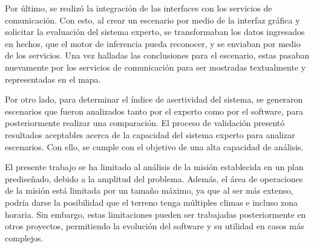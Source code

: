 Por último, se realizó la integración de las interfaces con los servicios de comunicación. Con esto, al crear un escenario por medio de la interfaz gráfica y solicitar la evaluación del sistema experto, se transformaban los datos ingresados en hechos, que el motor de inferencia pueda reconocer, y se enviaban por medio de los servicios. Una vez halladas las conclusiones para el escenario, estas pasaban nuevamente por los servicios de comunicación para ser mostradas textualmente y representadas en el mapa.

Por otro lado, para determinar el índice de asertividad del sistema, se generaron  escenarios que fueron analizados tanto por el experto como por el software, para posteriormente realizar una comparación. El proceso de validación presentó resultados aceptables acerca de la capacidad del sistema experto para analizar escenarios. Con ello, se cumple con el objetivo de una alta capacidad de análisis.

El presente trabajo se ha limitado al análisis de la misión establecida en un plan prediseñado, debido a la amplitud del problema. Además, el área de operaciones de la misión está limitada por un tamaño máximo, ya que al ser más extenso, podría darse la posibilidad que el terreno tenga múltiples climas e incluso zona horaria. Sin embargo, estas limitaciones pueden ser trabajadas posteriormente en otros proyectos, permitiendo la evolución del software y su utilidad en casos más complejos.





